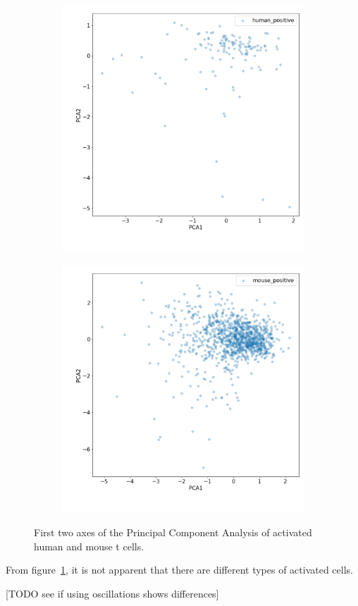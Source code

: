 \begin{figure}[h]
	\centering
	\begin{subfigure}{0.49\linewidth}
		\includegraphics[width=\textwidth]{fig/positive_control_human}
	\end{subfigure}
	\hfill
	\begin{subfigure}{0.49\linewidth}
		\includegraphics[width=\textwidth]{fig/positive_control_mouse}
	\end{subfigure}
	
	\caption{First two axes of the Principal Component Analysis of activated human and mouse t cells.}
	\label{fig:positive_control}
\end{figure}

From figure~\ref{fig:positive_control}, it is not apparent that there are different types of activated cells.

[TODO see if using oscillations shows differences]